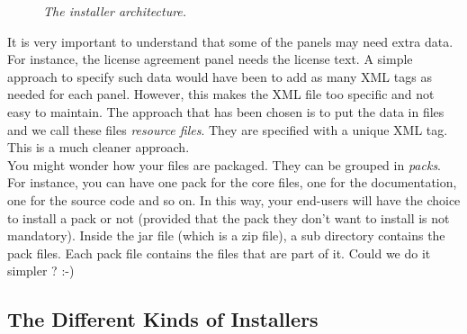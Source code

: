 \begin{figure}[h]
\caption{\label{archinstaller}
         \textit{The installer architecture.}}
\begin{center}
\end{center}
\end{figure}

It is very important to understand that some of the panels may need extra data. For
instance, the license agreement panel needs the license text. A simple approach
to specify such data would have been to add as many XML tags as needed for
each panel. However, this makes the XML file too specific and not easy to
maintain. The approach that has been chosen is to put the data in files and we
call these files \textit{resource files}. They are specified with a unique XML
tag. This is a much cleaner approach.\\

You might wonder how your files are packaged. They can be grouped in
\textit{packs}. For instance, you can have one pack for the core files, one for
the documentation, one for the source code and so on. In this way, your end-users
will have the choice to install a pack or not (provided that the pack they don't
want to install is not mandatory). Inside the jar file (which is a zip file), a
sub directory contains the pack files. Each pack file contains the files that are
part of it. Could we do it simpler ? :-)\\

\subsection{The Different Kinds of Installers}


